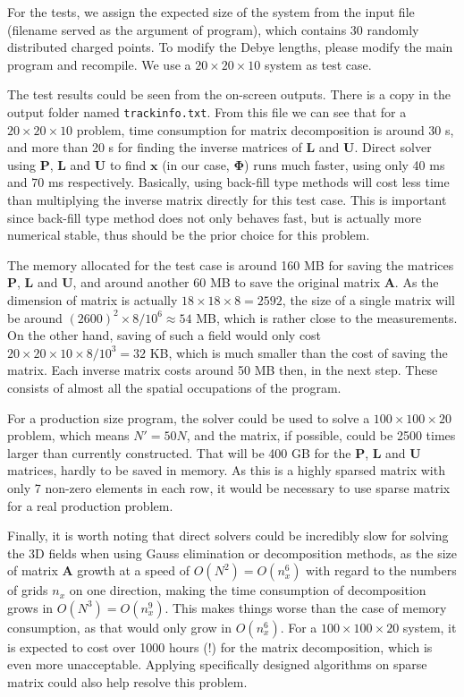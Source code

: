 \documentclass{article}
\begin{document}
\begin{spacing}{1.1}
For the tests, we assign the expected size of the system from the input file (filename served as the argument of program), which contains 30 randomly distributed charged points. To modify the Debye lengths, please modify the main program and recompile. We use a $20\times 20\times 10$ system as test case.

The test results could be seen from the on-screen outputs. There is a copy in the output folder named \texttt{trackinfo.txt}. From this file we can see that for a $20\times 20\times 10$ problem, time consumption for matrix decomposition is around 30 s, and more than 20 s for finding the inverse matrices of $\mathbf{L}$ and $\mathbf{U}$. Direct solver using $\mathbf{P}$, $\mathbf{L}$ and $\mathbf{U}$ to find $\mathbf{x}$ (in our case, $\mathbf{\Phi}$) runs much faster, using only 40 ms and 70 ms respectively. Basically, using back-fill type methods will cost less time than multiplying the inverse matrix directly for this test case. This is important since back-fill type method does not only behaves fast, but is actually more numerical stable, thus should be the prior choice for this problem.

The memory allocated for the test case is around 160 MB for saving the matrices $\mathbf{P}$, $\mathbf{L}$ and $\mathbf{U}$, and around another 60 MB to save the original matrix $\mathbf{A}$. As the dimension of matrix is actually $18\times 18\times 8 = 2592$, the size of a single matrix will be around $(2600)^2\times 8/10^6\approx 54$ MB, which is rather close to the measurements. On the other hand, saving of such a field would only cost $20\times 20\times 10\times 8/10^3 = 32$ KB, which is much smaller than the cost of saving the matrix. Each inverse matrix costs around 50 MB then, in the next step. These consists of almost all the spatial occupations of the program.

For a production size program, the solver could be used to solve a $100\times 100\times 20$ problem, which means $N'=50N$, and the matrix, if possible, could be 2500 times larger than currently constructed. That will be 400 GB for the $\mathbf{P}$, $\mathbf{L}$ and $\mathbf{U}$ matrices, hardly to be saved in memory. As this is a highly sparsed matrix with only 7 non-zero elements in each row, it would be necessary to use sparse matrix for a real production problem.

Finally, it is worth noting that direct solvers could be incredibly slow for solving the 3D fields when using Gauss elimination or decomposition methods, as the size of matrix $\mathbf{A}$ growth at a speed of $O(N^2)=O(n_x^6)$ with regard to the numbers of grids $n_x$ on one direction, making the time consumption of decomposition grows in $O(N^3)=O(n_x^9)$. This makes things worse than the case of memory consumption, as that would only grow in $O(n_x^6)$. For a $100\times 100\times 20$ system, it is expected to cost over 1000 hours (!) for the matrix decomposition, which is even more unacceptable. Applying specifically designed algorithms on sparse matrix could also help resolve this problem.


\end{spacing}
\end{document}
